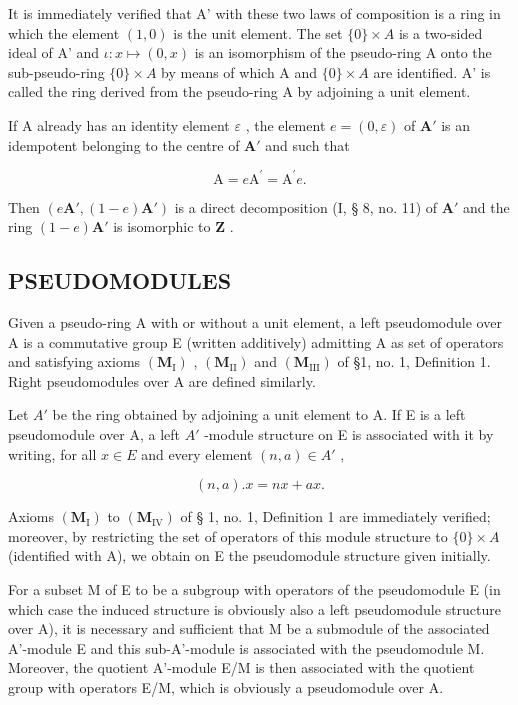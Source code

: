 It is immediately verified that A' with these two laws of composition is a ring in which the element \((1,0)\) is the unit element. The set \(\{0\} \times A\) is a two-sided ideal of A' and \(\iota: x \mapsto (0, x)\) is an isomorphism of the pseudo-ring A onto the sub-pseudo-ring \(\{0\} \times A\) by means of which A and \(\{0\} \times A\) are identified. A' is called the ring derived from the pseudo-ring A by adjoining a unit element.

If A already has an identity element \(\varepsilon\) , the element \(e = (0, \varepsilon)\) of \(\mathbf{A}'\) is an idempotent belonging to the centre of \(\mathbf{A}'\) and such that

\[
\mathrm{A} = e \mathrm{A} ^ {\prime} = \mathrm{A} ^ {\prime} e.
\]

Then \((e\mathbf{A}', (1 - e)\mathbf{A}')\) is a direct decomposition (I, § 8, no. 11) of \(\mathbf{A}'\) and the ring \((1 - e)\mathbf{A}'\) is isomorphic to \(\mathbf{Z}\) .

\subsection{PSEUDOMODULES}

Given a pseudo-ring A with or without a unit element, a left pseudomodule over A is a commutative group E (written additively) admitting A as set of operators and satisfying axioms \((\mathbf{M}_{\mathrm{I}})\) , \((\mathbf{M}_{\mathrm{II}})\) and \((\mathbf{M}_{\mathrm{III}})\) of §1, no. 1, Definition 1. Right pseudomodules over A are defined similarly.

Let \(A'\) be the ring obtained by adjoining a unit element to A. If E is a left pseudomodule over A, a left \(A'\) -module structure on E is associated with it by writing, for all \(x \in E\) and every element \((n, a) \in A'\) ,

\[
(n, a). x = n x + a x.\tag{2}
\]

Axioms \((\mathbf{M}_{\mathrm{I}})\) to \((\mathbf{M}_{\mathrm{IV}})\) of § 1, no. 1, Definition 1 are immediately verified; moreover, by restricting the set of operators of this module structure to \(\{0\} \times A\) (identified with A), we obtain on E the pseudomodule structure given initially.

For a subset M of E to be a subgroup with operators of the pseudomodule E (in which case the induced structure is obviously also a left pseudomodule structure over A), it is necessary and sufficient that M be a submodule of the associated A'-module E and this sub-A'-module is associated with the pseudomodule M. Moreover, the quotient A'-module E/M is then associated with the quotient group with operators E/M, which is obviously a pseudomodule over A.

